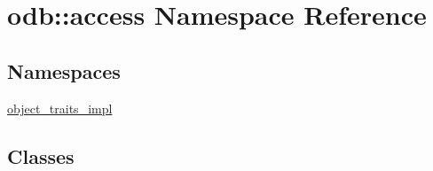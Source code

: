 \hypertarget{namespaceodb_1_1access}{}\section{odb\+:\+:access Namespace Reference}
\label{namespaceodb_1_1access}
\subsection*{Namespaces}
\begin{DoxyCompactItemize}
\item 
 \hyperlink{namespaceodb_1_1access_1_1object__traits__impl}{object\+\_\+traits\+\_\+impl}
\end{DoxyCompactItemize}
\subsection*{Classes}
